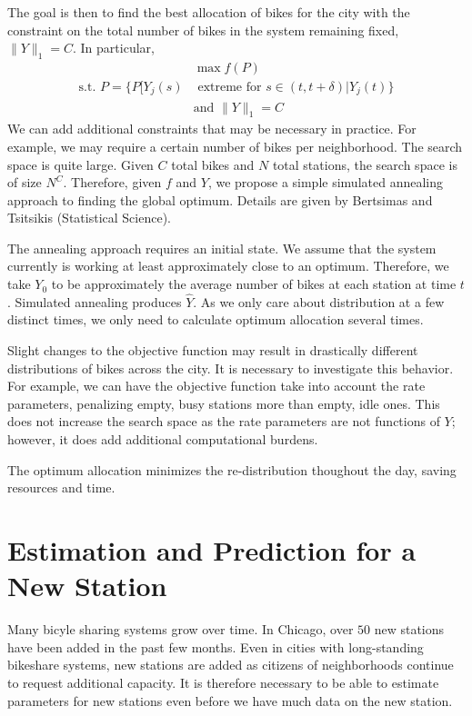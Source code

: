 \documentclass{acm_proc_article-sp}
\begin{document}
The goal is then to find the best allocation of bikes for the city with the constraint on the total number of bikes in the system remaining fixed, $\| Y\|_1 = C$.  In particular,
\begin{align*}
&\max f (P) \\
\text{s.t. } P = \{ P[ Y_j(s) &\text{ extreme for } s \in (t,t+\delta) | Y_j (t) \} \\
&\text{and } \| Y \|_1 = C
\end{align*}
We can add additional constraints that may be necessary in practice.  For example, we may require a certain number of bikes per neighborhood.  The search space is quite large.  Given $C$ total bikes and $N$ total stations, the search space is of size $N^C$.  Therefore, given $f$ and $Y$, we propose a simple simulated annealing approach to finding the global optimum.  Details are given by Bertsimas and Tsitsikis (Statistical Science).

The annealing approach requires an initial state.  We assume that the system currently is working at least approximately close to an optimum.  Therefore, we take $Y_0$ to be approximately the average number of bikes at each station at time $t$.  Simulated annealing produces $\hat{Y}$.  As we only care about distribution at a few distinct times, we only need to calculate optimum allocation several times. 

Slight changes to the objective function may result in drastically different distributions of bikes across the city.  It is necessary to investigate this behavior.  For example, we can have the objective function take into account the rate parameters, penalizing empty, busy stations more than empty, idle ones.  This does not increase the search space as the rate parameters are not functions of $Y$; however, it does add additional computational burdens. 

The optimum allocation minimizes the re-distribution thoughout the day, saving resources and time.


\section{Estimation and Prediction for a New Station} \label{newstation}

Many bicyle sharing systems grow over time.  In Chicago, over $50$ new stations have been added in the past few months.  Even in cities with long-standing bikeshare systems, new stations are added as citizens of neighborhoods continue to request additional capacity.  It is therefore necessary to be able to estimate parameters for new stations even before we have much data on the new station.
\end{document}
